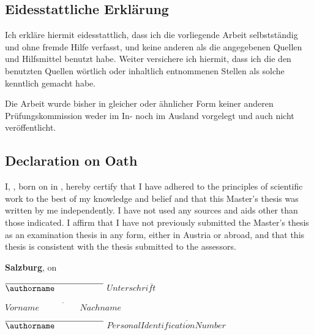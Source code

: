 
\ifhcilanguagegerman
\subsection*{Eidesstattliche Erklärung}

Ich erkläre hiermit eidesstattlich, dass ich die vorliegende Arbeit selbstständig und ohne fremde Hilfe verfasst, und keine anderen als die angegebenen Quellen und Hilfsmittel benutzt habe. Weiter versichere ich hiermit, dass ich die den benutzten Quellen wörtlich oder inhaltlich entnommenen Stellen als solche kenntlich gemacht habe.

Die Arbeit wurde bisher in gleicher oder ähnlicher Form keiner anderen Prüfungskommission weder im In- noch im Ausland vorgelegt und auch nicht veröffentlicht.


\else

\subsection*{Declaration on Oath}

I, \textbf{\authorname}, born on \textbf{\birthday} in \textbf{\birthplace}, hereby certify that I have adhered to the principles of scientific work to the best of my knowledge and belief and that this Master’s thesis was written by me independently. I have not used any sources and aids other than those indicated.
I affirm that I have not previously submitted the Master’s thesis as an examination thesis in any form, either in Austria or abroad, and that this thesis is consistent with the thesis submitted to the assessors.

\textbf{Salzburg}, on \textbf{\thesisdate}

\fi

\vspace*{3cm}



\hfill

\ifhcilanguagegerman
$\overline{\authorname \hspace{2cm}}$ \hfill $\overline{{Unterschrift}\hspace{2cm}}$

\vspace*{1cm}

\hfill $\overline{{Vorname\hspace{2cm}Nachname}}$
 
 \else
 $\overline{\authorname\hspace{2cm}}$ \hfil
 $\overline {Personal Identification Number \hspace{2cm}}$

 \fi

